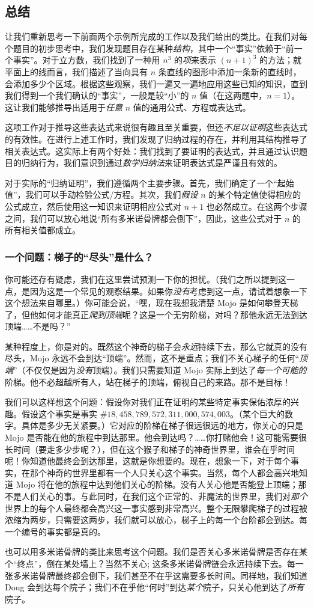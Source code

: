 \subsection{总结}

让我们重新思考一下前面两个示例所完成的工作以及我们给出的类比。在我们对每个题目的初步思考中，我们发现题目存在某种\emph{结构}，其中一个``事实''依赖于``前一个事实''。对于立方数，我们找到了一种用 $n^3$ 的\emph{项}来表示 $(n + 1)^3$ 的方法；就平面上的线而言，我们描述了当向具有 $n$ 条直线的图形中添加一条新的直线时，会添加多少个区域。根据这些观察，我们一遍又一遍地应用这些已知的知识，直到我们得到一个我们确认的``事实''，一般是较``小''的 $n$ 值（在这两题中，$n = 1$）。这让我们能够推导出适用于\emph{任意} $n$ 值的通用公式、方程或表达式。

这项工作对于推导这些表达式来说很有趣且至关重要，但还\emph{不足以证明}这些表达式的有效性。在进行上述工作时，我们发现了归纳过程的存在，并利用其结构推导了相关表达式。这实际上有两个好处：我们找到了要证明的表达式，并且通过认识题目的归纳行为，我们意识到通过\emph{数学归纳法}来证明表达式是严谨且有效的。

对于实际的``归纳证明''，我们遵循两个主要步骤。首先，我们确定了一个``起始值''，我们可以手动检验公式/方程。其次，我们\emph{假设} $n$ 的某个特定值使得相应的公式成立，然后使用这一知识来证明相应公式对 $n + 1$ 也必然成立。在这两个步骤之间，我们可以放心地说``所有多米诺骨牌都会倒下''，因此，这些公式对于 $n$ 的所有相关值都成立。

\subsubsection*{一个问题：梯子的``尽头''是什么？}

你可能还存有疑虑，我们在这里尝试预测一下你的担忧。（我们之所以提到这一点，是因为这是一个常见的观察结果。如果你\emph{没有}考虑到这一点，请试着想象一下这个想法来自哪里。）你可能会说，``嘿，现在我想我清楚 Mojo 是如何攀登天梯了，但他如何才能真正\emph{爬到顶端}呢？这是一个无穷阶梯，对吗？那他永远无法到达顶端……不是吗？''

某种程度上，你是对的。既然这个神奇的梯子会\emph{永远}持续下去，那么它就真的没有尽头，Mojo 永远不会到达``顶端''。然而，这不是重点；我们不关心梯子的任何``\emph{顶端}''（不仅仅是因为\emph{没有}顶端）。我们只需要知道 Mojo 实际上到达了\emph{每一个可能的}阶梯。他不必超越所有人，站在梯子的顶端，俯视自己的来路。那不是目标！

我们可以这样想这个问题：假设你对我们正在证明的某些特定事实保佑浓厚的兴趣。假设这个事实是事实 $\#18,458,789,572,311,000,574,003$。（某个巨大的数字。具体是多少无关紧要。）它对应的阶梯在梯子很远很远的地方，你关心的只是 Mojo 是否能在他的旅程中到达那里。他会到达吗？……你打赌他会！这可能需要很长时间（要走多少步呢？），但在这个猴子和梯子的神奇世界里，谁会在乎时间呢！你知道他最终会到达那里，这就是你想要的。现在，想象一下，对于每个事实，在那个神奇的世界里都有一个人只关心这个事实。当然，每个人都会高兴地知道 Mojo 将在他的旅程中达到他们关心的阶梯。没有人关心他是否能登上顶端；那不是人们关心的事。与此同时，在我们这个正常的、非魔法的世界里，我们对\emph{那个}世界上的每个人最终都会高兴这一事实感到非常高兴。整个无限攀爬梯子的过程被浓缩为两步，只需要这两步，我们就可以放心，梯子上的每一个台阶都会到达。每一个编号的事实都是真的。

也可以用多米诺骨牌的类比来思考这个问题。我们是否关心多米诺骨牌是否存在某个``终点''，倒在某处墙上？当然不关心; 这条多米诺骨牌链会永远持续下去。每一张多米诺骨牌最终都会倒下，我们甚至不在乎这需要多长时间。同样地，我们知道 Doug 会到达每个院子；我们不在乎他``何时''到达\emph{某个}院子，只关心他到达了\emph{所有}院子。
